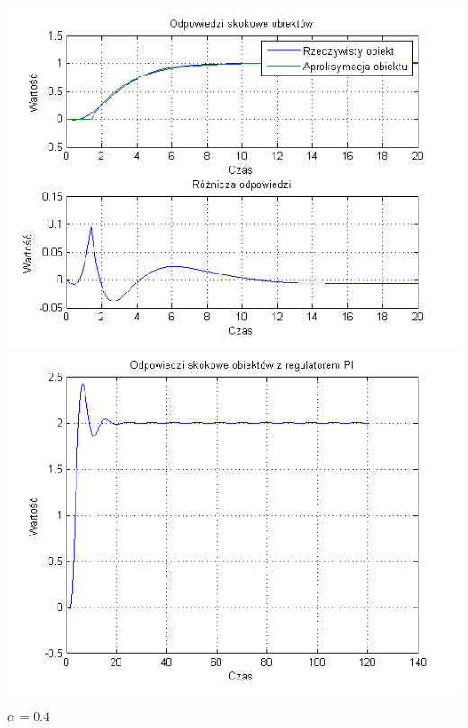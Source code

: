 \documentclass[10pt,a4paper]{article}
\begin{document}
\begin{center}
\includegraphics[scale=1]{images/jeden/skrypt_229.png}\\
\includegraphics[scale=1]{images/jeden/skrypt_230.png}\\
\end{center}
\newpage
$\alpha$ = 0.4
\end{document}
